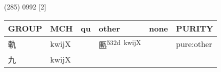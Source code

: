 \documentclass[14pt,a4paper]{scrartcl}
\begin{document}
(285) 0992 {[}2{]}

\begin{longtable}[c]{@{}llllll@{}}
\toprule
\begin{minipage}[b]{0.14\columnwidth}\raggedright\strut
GROUP
\strut\end{minipage} &
\begin{minipage}[b]{0.14\columnwidth}\raggedright\strut
MCH
\strut\end{minipage} &
\begin{minipage}[b]{0.14\columnwidth}\raggedright\strut
qu
\strut\end{minipage} &
\begin{minipage}[b]{0.14\columnwidth}\raggedright\strut
other
\strut\end{minipage} &
\begin{minipage}[b]{0.14\columnwidth}\raggedright\strut
none
\strut\end{minipage} &
\begin{minipage}[b]{0.14\columnwidth}\raggedright\strut
PURITY
\strut\end{minipage}\tabularnewline
\midrule
\endhead
\begin{minipage}[t]{0.14\columnwidth}\raggedright\strut
軌
\strut\end{minipage} &
\begin{minipage}[t]{0.14\columnwidth}\raggedright\strut
kwijX
\strut\end{minipage} &
\begin{minipage}[t]{0.14\columnwidth}\raggedright\strut
\strut\end{minipage} &
\begin{minipage}[t]{0.14\columnwidth}\raggedright\strut
匭\textsuperscript{532d~kwijX}
\strut\end{minipage} &
\begin{minipage}[t]{0.14\columnwidth}\raggedright\strut
\strut\end{minipage} &
\begin{minipage}[t]{0.14\columnwidth}\raggedright\strut
pure:other
\strut\end{minipage}\tabularnewline
\begin{minipage}[t]{0.14\columnwidth}\raggedright\strut
九
\strut\end{minipage} &
\begin{minipage}[t]{0.14\columnwidth}\raggedright\strut
kwijX
\strut\end{minipage} &
\begin{minipage}[t]{0.14\columnwidth}\raggedright\strut

\end{minipage}
\end{longtable}
\end{document}

